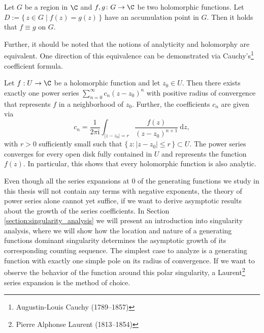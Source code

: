 \begin{theorem} \label{thm:identity}
  Let $G$ be a region in $\C$ and $f, g\colon G \to \C$ be two holomorphic functions. Let $D := \{\, z \in G \mid f(z) = g(z) \,\}$ have an accumulation point in $G$. Then it holds that $f \equiv g$ on $G$.
\end{theorem}

Further, it should be noted that the notions of analyticity and holomorphy are equivalent. One direction of this equivalence can be demonstrated via Cauchy's\footnote{Augustin-Louis Cauchy (1789--1857)} coefficient formula.

\begin{theorem}
  Let $f: U \to \C$ be a holomorphic function and let $z_{0} \in U$. Then there exists exactly one power series $\sum_{n=0}^{\infty}c_{n}(z-z_{0})^{n}$ with positive radius of convergence that represents $f$ in a neighborhood of $z_{0}$. Further, the coefficients $c_{n}$ are given via
  $$
    c_{n} = \frac{1}{2\pi \mathrm{i}}\int_{|z-z_{0}|=r} \frac{f(z)}{(z-z_{0})^{n+1}}~\mathrm{d}z,
  $$
  with $r > 0$ sufficiently small such that $\{\, z: |z - z_{0}| \leq r \,\} \subset U$. 
  The power series converges for every open disk fully contained in $U$ and represents the function $f(z)$. In particular, this shows that every holomorphic function is also analytic.
\end{theorem}

Even though all the series expansions at $0$ of the generating functions we study in this thesis will not contain any terms with negative exponents, the theory of power series alone cannot yet suffice, if we want to derive asymptotic results about the growth of the series coefficients.
In Section \ref{section:singularity_analysis} we will present an introduction into singularity analysis, where we will show how the location and nature of a generating functions dominant singularity determines the asymptotic growth of its corresponding counting sequence.
The simplest case to analyze is a generating function with exactly one simple pole on its radius of convergence. If we want to observe the behavior of the function around this polar singularity, a Laurent\footnote{Pierre Alphonse Laurent (1813--1854)} series expansion is the method of choice.


